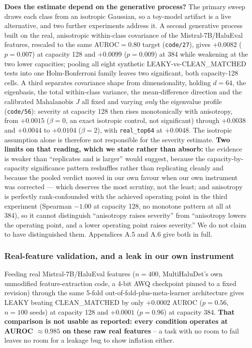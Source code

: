 \documentclass[10pt]{article} %
\begin{document}
\textbf{Does the estimate depend on the generative process?} The primary sweep
draws each class from an isotropic Gaussian, so a toy-model artifact is a live
alternative, and two further experiments address it. A second generative
process built on the real, anisotropic within-class covariance of the
Mistral-7B/HaluEval features, rescaled to the same AUROC$=0.80$ target
(\texttt{code/27}), gives $+0.0082$ ($p=0.007$) at capacity 128 and $+0.0099$
($p=0.009$) at 384 while weakening at the two lower capacities; pooling all
eight synthetic LEAKY-vs-CLEAN\_MATCHED tests into one Holm-Bonferroni family
leaves two significant, both capacity-128 cells. A third separates covariance
shape from dimensionality, holding $d=64$, the eigenbasis, the total
within-class variance, the mean-difference direction and the calibrated
Mahalanobis $J$ all fixed and varying \emph{only} the eigenvalue profile
(\texttt{code/56}): severity at capacity 128 then rises monotonically with
anisotropy, from $+0.0015$ ($\beta=0$, an exact isotropic control, not
significant) through $+0.0038$ and $+0.0044$ to $+0.0104$ ($\beta=2$), with
\texttt{real\_top64} at $+0.0048$. The isotropic assumption alone is therefore
not responsible for the severity estimate. \textbf{Two limits on that reading,
which we state rather than absorb:} the evidence is weaker than ``replicates
and is larger'' would suggest, because the capacity-by-capacity significance
pattern reshuffles rather than replicating cleanly and because the pooled
verdict moved in our own favour when our own instrument was corrected --- which
deserves the most scrutiny, not the least; and anisotropy is perfectly
rank-confounded with the achieved operating point in the third experiment
(Spearman $-1.00$ at capacity 128, no monotone pattern at all at 384), so it
cannot distinguish ``anisotropy raises severity'' from ``anisotropy lowers the
operating point, and a lower operating point raises severity.'' We do not claim
to have distinguished them. Appendices A.5 and A.6 give both in full.

\subsubsection{Real-feature validation, and a leak in our own instrument}

Feeding real Mistral-7B/HaluEval features ($n=400$, MultiHaluDet's own
unmodified feature-extraction code, a 4-bit AWQ checkpoint pinned to a fixed
revision) through the same 5-fold out-of-fold-plus-meta-learner architecture
gives LEAKY beating CLEAN\_MATCHED by only $+0.0002$ AUROC ($p=0.56$, $n=100$
seeds) at capacity 128 and $+0.0001$ ($p=0.96$) at capacity 384. \textbf{That
comparison is not usable as reported: every condition operates at AUROC
$\approx0.985$ on these raw real features} -- a task with no room to fail
leaves no room for a leakage bug to show inflation either.
\end{document}
